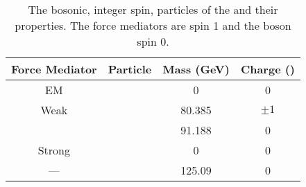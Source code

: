 \begin{table}
	\centering
	\footnotesize
	\caption{The bosonic, integer spin, particles of the \SM{} and their properties. The force mediators are spin 1 and the \Hboson{} boson spin 0.}
	\label{tb:SM_Bosons}
	\begin{tabular}{cccc}
		\vspace*{0.02cm} \textbf{Force Mediator} 	& \textbf{Particle} 	& \textbf{Mass (GeV)} 	& \textbf{Charge (\electron{})} \\
		\hline
		EM 							& \photon{} 			& 0 						& 0 \uppertablespace\\	 
		Weak 						& \Wboson{} 			& 80.385 					& $\pm1$ \\
									& \Zboson{}	 			& 91.188 					& 0 \\	
		Strong 						& \gluon{}				& 0 						& 0	\\	 
		---							& \Hboson{}				& 125.09 					& 0 \\	 
	\end{tabular}
\end{table}